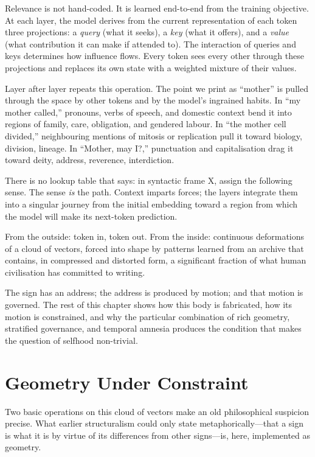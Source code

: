 \documentclass[12pt,a4paper]{article}
\begin{document}
Relevance is not hand-coded. It is learned end-to-end from the training objective. At each layer, the model derives from the current representation of each token three projections: a \emph{query} (what it seeks), a \emph{key} (what it offers), and a \emph{value} (what contribution it can make if attended to). The interaction of queries and keys determines how influence flows. Every token sees every other through these projections and replaces its own state with a weighted mixture of their values.

Layer after layer repeats this operation. The point we print as ``mother'' is pulled through the space by other tokens and by the model's ingrained habits. In ``my mother called,'' pronouns, verbs of speech, and domestic context bend it into regions of family, care, obligation, and gendered labour. In ``the mother cell divided,'' neighbouring mentions of mitosis or replication pull it toward biology, division, lineage. In ``Mother, may I?,'' punctuation and capitalisation drag it toward deity, address, reverence, interdiction.

There is no lookup table that says: in syntactic frame X, assign the following sense. The sense \emph{is} the path. Context imparts forces; the layers integrate them into a singular journey from the initial embedding toward a region from which the model will make its next-token prediction.

From the outside: token in, token out. From the inside: continuous deformations of a cloud of vectors, forced into shape by patterns learned from an archive that contains, in compressed and distorted form, a significant fraction of what human civilisation has committed to writing.

The sign has an address; the address is produced by motion; and that motion is governed. The rest of this chapter shows how this body is fabricated, how its motion is constrained, and why the particular combination of rich geometry, stratified governance, and temporal amnesia produces the condition that makes the question of selfhood non-trivial.

\section{Geometry Under Constraint}

Two basic operations on this cloud of vectors make an old philosophical suspicion precise. What earlier structuralism could only state metaphorically---that a sign is what it is by virtue of its differences from other signs---is, here, implemented as geometry.
\end{document}
